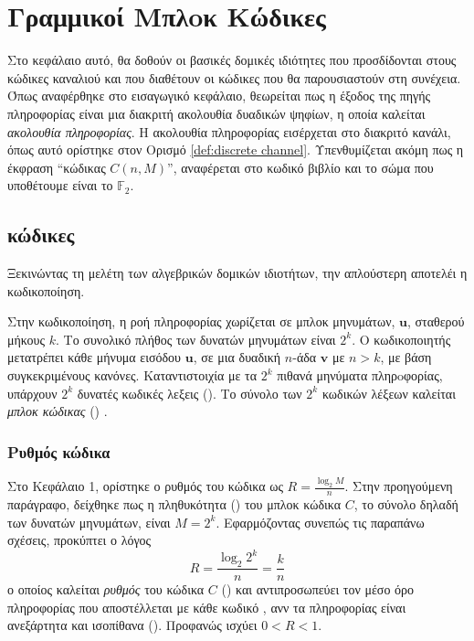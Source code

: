 \chapter{Γραμμικοί Μπλoκ Κώδικες}

Στο κεφάλαιο αυτό, θα δοθούν οι βασικές δομικές ιδιότητες που προσδίδονται στους κώδικες καναλιού και που διαθέτουν οι κώδικες που θα παρουσιαστούν στη συνέχεια. Όπως αναφέρθηκε στο εισαγωγικό κεφάλαιο, θεωρείται πως η έξοδος της πηγής πληροφορίας είναι μια διακριτή ακολουθία δυαδικών ψηφίων, η οποία καλείται \textit{ακολουθία πληροφορίας}. Η ακολουθία πληροφορίας εισέρχεται στο διακριτό κανάλι, όπως αυτό ορίστηκε στον Ορισμό \ref{def:discrete channel}. Υπενθυμίζεται ακόμη πως η έκφραση \enquote{κώδικας $C(n,M)$}, αναφέρεται στο κωδικό βιβλίο και το σώμα που υποθέτουμε είναι το $\mathbb{F}_2$.

\section{ κώδικες}
Ξεκινώντας τη μελέτη των αλγεβρικών δομικών ιδιοτήτων, την απλούστερη αποτελέι η  κωδικοποίηση.

Στην  κωδικοποίηση, η ροή πληροφορίας χωρίζεται σε μπλοκ μηνυμάτων, $\mathbf{u}$, σταθερού μήκους $k$. Το συνολικό πλήθος των δυνατών μηνυμάτων είναι $2^k$. Ο κωδικοποιητής μετατρέπει κάθε μήνυμα εισόδου $\mathbf{u}$, σε μια δυαδική $n$-άδα $\mathbf{v}$ με $n>k$, με βάση συγκεκριμένους κανόνες. Κατ\textquotesingle αντιστοιχία με τα $2^k$ πιθανά μηνύματα πληρoφορίας, υπάρχουν $2^k$ δυνατές κωδικές λεξεις (). Το σύνολο των $2^k$ κωδικών λέξεων καλείται \textit{μπλοκ κώδικας} () \cite{lin2004error}.

\subsection{Ρυθμός κώδικα}
Στο Κεφάλαιο 1, ορίστηκε ο ρυθμός του κώδικα ως $R=\frac{\log_{2}M}{n}$. Στην προηγούμενη παράγραφο, δείχθηκε πως η πληθυκότητα () του μπλοκ κώδικα $C$, το σύνολο δηλαδή των δυνατών μηνυμάτων, είναι $M=2^k$. Εφαρμόζοντας συνεπώς τις παραπάνω σχέσεις, προκύπτει ο λόγος
\begin{equation}
R = \frac{\log_{2}2^{k}}{n} = \frac{k}{n}
\label{eq:code rate}
\end{equation}
ο οποίος καλείται \textit{ρυθμός} του κώδικα $C$ () και αντιπροσωπεύει τον μέσο όρο πληροφορίας που αποστέλλεται με κάθε κωδικό , ανν τα  πληροφορίας είναι ανεξάρτητα και ισοπίθανα (). Προφανώς ισχύει $0<R<1$.


